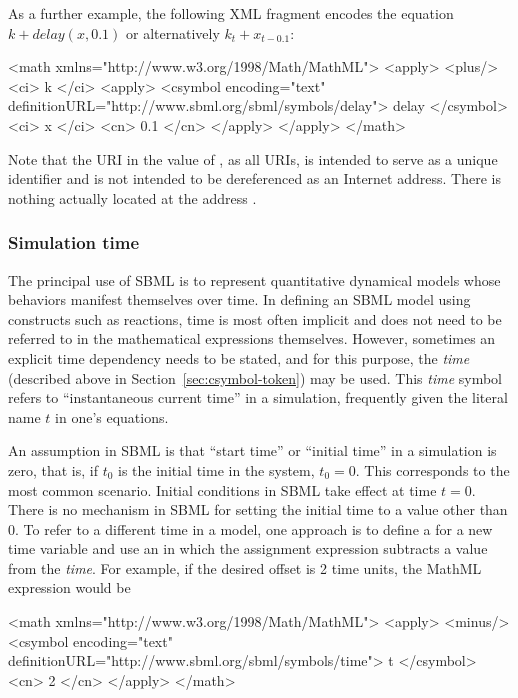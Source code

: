 As a further example, the following XML fragment encodes the equation
$k + delay(x, 0.1)$ or alternatively $k_t + x_{t - 0.1}$:

\begin{example}
<math xmlns="http://www.w3.org/1998/Math/MathML">
    <apply>
        <plus/>
        <ci> k </ci>
        <apply>
            <csymbol encoding="text" definitionURL="http://www.sbml.org/sbml/symbols/delay">
                delay
            </csymbol>
            <ci> x </ci>
            <cn> 0.1 </cn>
        </apply>
    </apply>
</math>
\end{example}

Note that the URI in the value of , as all
URIs, is intended to serve as a unique identifier and is not
intended to be dereferenced as an Internet address.  There is
nothing actually located at the address
.


\subsubsection{Simulation time}
\label{sec:meaning-of-time}

The principal use of SBML is to represent quantitative dynamical
models whose behaviors manifest themselves over time.  In defining
an SBML model using constructs such as reactions, time is most
often implicit and does not need to be referred to in the
mathematical expressions themselves.  However, sometimes an
explicit time dependency needs to be stated, and for this purpose,
the \emph{time}  (described above in
Section~\ref{sec:csymbol-token}) may be used.  This \emph{time}
symbol refers to ``instantaneous current time'' in a simulation,
frequently given the literal name $t$ in one's equations.

An assumption in SBML is that ``start time'' or ``initial time''
in a simulation is zero, that is, if $t_0$ is the initial time in
the system, $t_0 = 0$.  This corresponds to the most common
scenario.  Initial conditions in SBML take effect at time $t = 0$.
There is no mechanism in SBML for setting the initial time to a
value other than 0.  To refer to a different time in a model, one
approach is to define a \Parameter for a new time variable and use
an \AssignmentRule in which the assignment expression subtracts a
value from the  \emph{time}.  For example, if the
desired offset is 2 time units, the MathML expression would be

\begin{example}
<math xmlns="http://www.w3.org/1998/Math/MathML">
    <apply>
        <minus/>
        <csymbol encoding="text" definitionURL="http://www.sbml.org/sbml/symbols/time"> t
        </csymbol>
        <cn> 2 </cn>
    </apply>
</math>
\end{example}

